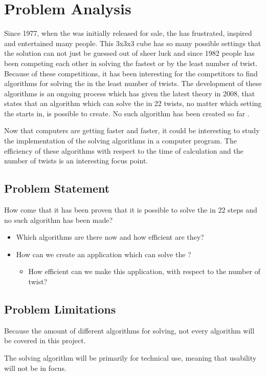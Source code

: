\chapter{Problem Analysis}
Since 1977, when the \rubik{} was initially released for sale, the \rubik{} has frustrated, inspired and entertained many people. This 3x3x3 cube has so many possible settings that the solution can not just be guessed out of sheer luck and since 1982 people has been competing each other in solving the \rubik{} fastest or by the least number of twist. Because of these competitions, it has been interesting for the competitors to find algorithms for solving the \rubik{} in the least number of twists. The development of these algorithms is an ongoing process which has given the latest theory in 2008, that states that an algorithm which can solve the \rubik{} in 22 twists, no matter which setting the \rubik{} starts in, is possible to create. No such algorithm has been created so far \cite{rokicki09}.

Now that computers are getting faster and faster, it could be interesting to study the implementation of the solving algorithms in a computer program. The efficiency of these algorithms with respect to the time of calculation and the number of twists is an interesting focus point.

\section{Problem Statement}
How come that it has been proven that it is possible to solve the \rubik{} in 22 steps and no such algorithm has been made?
\begin{itemize}
	\item Which algorithms are there now and how efficient are they?
	\item How can we create an application which can solve the \rubik{}?
	\begin{itemize}
		\item How efficient can we make this application, with respect to the number of twist?
	\end{itemize}
\end{itemize}

\section{Problem Limitations}
Because the amount of different algorithms for \rubik{} solving, not every algorithm will be covered in this project.

The \rubik{} solving algorithm will be primarily for technical use, meaning that usability will not be in focus.